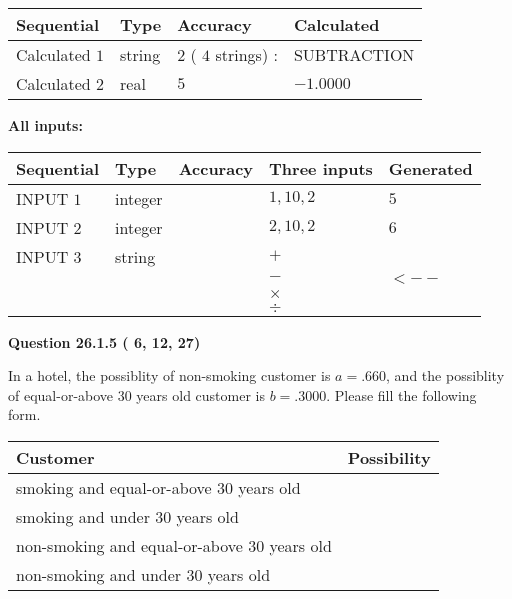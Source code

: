 \documentclass[12pt]{article}
\begin{document}
  
\noindent\begin{tabular}{|l|l|l|l|}
\hline
 Sequential & Type & Accuracy & Calculated \\ 
\hline
 
 
  Calculated $           1$ & string & $           2 $ ( $          4 $ strings)
 : 
 & SUBTRACTION
 \\  \hline  
 
 
  Calculated $           2$ & real & $           5 $ & 
 $ -1.0000 $ 
 \\  \hline  
 \end{tabular}
   
   
   
   
\noindent\vspace{0.1in}\hspace{-0.08in} {\textbf{\Large{All inputs: }}}
   
   
  
  
\noindent\begin{tabular}{|l|l|l|l|l|}
\hline
 Sequential & Type & Accuracy & Three inputs & Generated \\ 
\hline
 
 
  INPUT $           1$ & integer &  & $
 1
 , 
 10
 , 
 2
 $ & $ 5 $ 
 \\  \hline  
 
 
  INPUT $           2$ & integer &  & $
 2
 , 
 10
 , 
 2
 $ & $ 6 $ 
 \\  \hline  
 
 
  INPUT $           3$ & string & & 
 $+$ & 
  \\
  & & & 
 $-$ & 
  $ <-- $ 
  \\
  & & & 
 $\times$ & 
  \\
  & & & 
 $\div$ & 
 \\  \hline  
 \end{tabular}
   
   
  
\vspace{0.2in}
  
{\textbf{\Large{Question
26.1.5 
 (          6,         12,         27)
}}}
  
  
In a hotel, the possiblity of  %
non-smoking customer is
$a =  %
.660$, and the possiblity of  %
equal-or-above 30 years old customer is $ b =  %
.3000$.
Please fill the following form.
 
\noindent
\begin{tabular}{|l|l|}
\hline
Customer & Possibility \\
\hline
smoking  and   %
equal-or-above 30 years old  & \\
\hline
smoking  and   %
under 30 years old & \\
\hline
 non-smoking and   %
equal-or-above 30 years old  & \\
\hline
 non-smoking and  %
under 30 years old & \\
\hline
\end{tabular}
 
\end{document}
